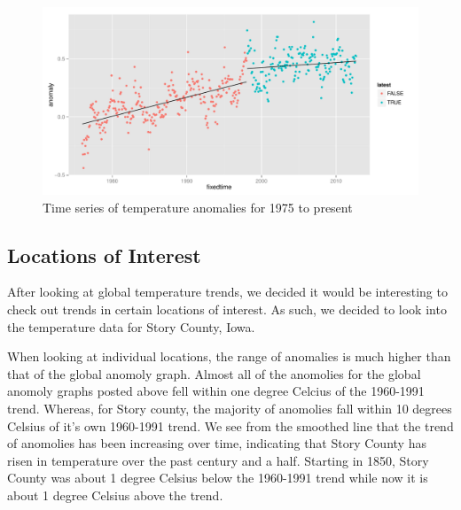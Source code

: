 \documentclass{article}\usepackage{graphicx, color}
\newenvironment{knitrout}{}{} %
\begin{document}
\begin{figure}[H]
\begin{knitrout}
\color{fgcolor}\includegraphics[width=\linewidth]{figure/recent-trend} 
\end{knitrout}

\caption{\label{1975topresent}Time series of temperature anomalies for 1975 to present}
\end{figure}

\subsection*{Locations of Interest}

After looking at global temperature trends, we decided it would be interesting to check out trends in certain locations of interest. As such, we decided to look into the temperature data for Story County, Iowa.

When looking at individual locations, the range of anomalies is much higher than that of the global anomoly graph. Almost all of the anomolies for the global anomoly graphs posted above fell within one degree Celcius of the 1960-1991 trend. Whereas, for Story county, the majority of anomolies fall within 10 degrees Celsius of it's own 1960-1991 trend. We see from the smoothed line that the trend of anomolies has been increasing over time, indicating that Story County has risen in temperature over the past century and a half. Starting in 1850, Story County was about 1 degree Celsius below the 1960-1991 trend while now it is about 1 degree Celsius above the trend.

\end{document}
